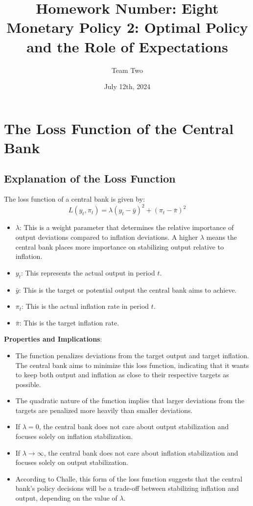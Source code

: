 \documentclass{article}
\title{Homework Number: Eight\\ \large Monetary Policy 2: Optimal Policy and the Role of Expectations}
\author{Team Two}
\date{July 12th, 2024}
\begin{document}
\maketitle

\section{The Loss Function of the Central Bank}

\subsection{Explanation of the Loss Function}
The loss function of a central bank is given by:
\[
L (y_t, \pi_t) = \lambda (y_t - \bar{y})^2 + (\pi_t - \bar{\pi})^2
\]

\begin{itemize}
    \item \(\lambda\): This is a weight parameter that determines the relative importance of output deviations compared to inflation deviations. A higher \(\lambda\) means the central bank places more importance on stabilizing output relative to inflation.
    \item \(y_t\): This represents the actual output in period \(t\).
    \item \(\bar{y}\): This is the target or potential output the central bank aims to achieve.
    \item \(\pi_t\): This is the actual inflation rate in period \(t\).
    \item \(\bar{\pi}\): This is the target inflation rate.
\end{itemize}

\textbf{Properties and Implications}:
\begin{itemize}
    \item The function penalizes deviations from the target output and target inflation. The central bank aims to minimize this loss function, indicating that it wants to keep both output and inflation as close to their respective targets as possible.
    \item The quadratic nature of the function implies that larger deviations from the targets are penalized more heavily than smaller deviations.
    \item If \(\lambda = 0\), the central bank does not care about output stabilization and focuses solely on inflation stabilization.
    \item If \(\lambda \to \infty\), the central bank does not care about inflation stabilization and focuses solely on output stabilization.
    \item According to Challe, this form of the loss function suggests that the central bank's policy decisions will be a trade-off between stabilizing inflation and output, depending on the value of \(\lambda\).
\end{itemize}
\end{document}
